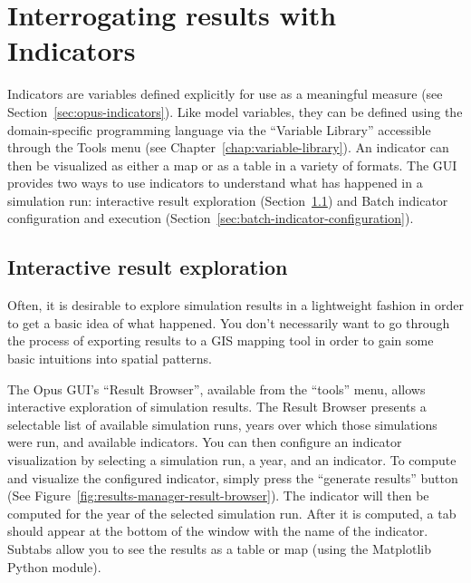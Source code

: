 \section{Interrogating results with Indicators}
\label{sec:interrogating-results-with-indicators}

Indicators are variables defined explicitly for use as a meaningful
measure (see Section~\ref{sec:opus-indicators}). Like model variables,
they can be defined using the domain-specific programming language via
the ``Variable Library'' accessible through the Tools menu (see
Chapter~\ref{chap:variable-library}). An indicator can then be
visualized as either a map or as a table in a variety of
formats. The GUI provides two ways to use indicators to understand what
has happened in a simulation run: interactive result exploration
(Section~\ref{sec:interactive-result-exploration}) and Batch
indicator configuration and execution
(Section~\ref{sec:batch-indicator-configuration}).

\subsection{Interactive result exploration}\label{sec:interactive-result-exploration}
\label{sec:interactive-result-exploration}
Often, it is desirable to explore simulation results in a lightweight
fashion in order to get a basic idea of what happened. You don't
necessarily want to go through the process of exporting results to a
GIS mapping tool in order to gain some basic intuitions into spatial
patterns.

The Opus GUI's ``Result Browser'', available from the ``tools''
menu, allows interactive exploration of simulation results. The Result
Browser presents a selectable list of available simulation runs, years
over which those simulations were run, and available indicators. You
can then configure an indicator visualization by selecting a simulation
run, a year, and an indicator. To compute and visualize the configured
indicator, simply press the ``generate results'' button (See
Figure~\ref{fig:results-manager-result-browser}). The
indicator will then be computed for the year of the selected simulation
run. After it is computed, a tab should appear at the bottom of the
window with the name of the indicator. Subtabs allow you to see the
results as a table or map (using the Matplotlib Python module). 

